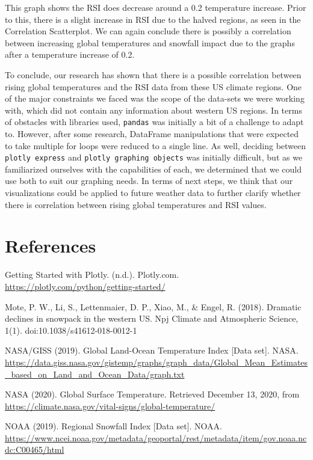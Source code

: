 \documentclass[fontsize=11pt]{article}
\begin{document}
This graph shows the RSI does decrease around a 0.2 temperature increase. Prior to this, there is a slight increase in RSI due to the halved regions, as seen in the Correlation Scatterplot. We can again conclude there is possibly a correlation between increasing global temperatures and snowfall impact due to the graphs after a temperature increase of 0.2.


To conclude, our research has shown that there is a possible correlation between rising global temperatures and the RSI data from these US climate regions. One of the major constraints we faced was the scope of the data-sets we were working with, which did not contain any information about western US regions. In terms of obstacles with libraries used, \texttt{pandas} was initially a bit of a challenge to adapt to. However, after some research, DataFrame manipulations that were expected to take multiple for loops were reduced to a single line. As well, deciding between \texttt{plotly express} and \texttt{plotly graphing objects} was initially difficult, but as we familiarized ourselves with the capabilities of each, we determined that we could use both to suit our graphing needs. In terms of next steps, we think that our visualizations could be applied to future weather data to further clarify whether there is correlation between rising global temperatures and RSI values.

\section*{References}

Getting Started with Plotly. (n.d.). Plotly.com. \url{https://plotly.com/python/getting-started/}

Mote, P. W., Li, S., Lettenmaier, D. P., Xiao, M., \& Engel, R. (2018). Dramatic declines in snowpack in the western US. Npj Climate and Atmospheric Science, 1(1). doi:10.1038/s41612-018-0012-1

NASA/GISS (2019). Global Land-Ocean Temperature Index [Data set]. NASA. \url{https://data.giss.nasa.gov/gistemp/graphs/graph\_data/Global\_Mean\_Estimates\_based\_on\_Land\_and\_Ocean\_Data/graph.txt}

NASA (2020). Global Surface Temperature. Retrieved December 13, 2020, from \url{https://climate.nasa.gov/vital-signs/global-temperature/}

NOAA (2019). Regional Snowfall Index [Data set]. NOAA. \url{https://www.ncei.noaa.gov/metadata/geoportal/rest/metadata/item/gov.noaa.ncdc:C00465/html}
\end{document}
